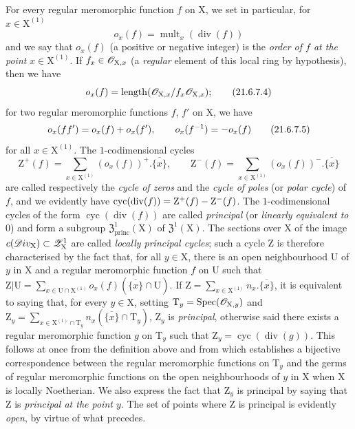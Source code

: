 \begin{env}[21.6.7]
For every regular meromorphic function $f$ on $\mathrm{X}$, we set in particular, for $x\in\mathrm{X}^{(1)}$
\[
\label{IV.21.6.7.3}
  o_x(f)=\operatorname{mult}_x(\operatorname{div}(f))
  \tag{21.6.7.3}
\]
and we say that $o_x(f)$ (a positive or negative integer) is the \emph{order of $f$ at the point} $x\in\mathrm{X}^{(1)}$.
If $f_x\in\mathscr{O}_{\mathrm{X},x}$ (a \emph{regular} element of this local ring by hypothesis), then we have
\[
\label{IV.21.6.7.4}
  o_x(f)=\operatorname{length}(\mathscr{O}_{\mathrm{X},x}/f_x\mathscr{O}_{\mathrm{X},x});
  \tag{21.6.7.4}
\]
for two regular meromorphic functions $f$, $f'$ on $\mathrm{X}$, we have
\[
\label{IV.21.6.7.5}
  o_x(ff')=o_x(f)+o_x(f'),\qquad o_x(f^{-1})=- o_x(f)
  \tag{21.6.7.5}
\]
for all $x\in\mathrm{X}^{(1)}$.
The $1$-codimensional cycles
\[
  \mathrm{Z}^+(f)=\sum_{x\in\mathrm{X}^{(1)}}(o_x(f))^+.\overline{\{x\}},\qquad
  \mathrm{Z}^-(f)=\sum_{x\in\mathrm{X}^{(1)}}(o_x(f))^-.\overline{\{x\}}
\]
are called respectively the \emph{cycle of zeros} and the \emph{cycle of poles} (or \emph{polar cycle}) of $f$, and we evidently have $\operatorname{cyc}(\operatorname{div}(f))=\mathrm{Z}^+(f)- \mathrm{Z}^-(f)$.
The $1$-codimensional cycles of the form $\operatorname{cyc}(\operatorname{div}(f))$ are called \emph{principal} (or \emph{linearly equivalent to} $0$) and form a subgroup $\mathfrak{Z}^1_\mathrm{princ}(\mathrm{X})$ of $\mathfrak{Z}^1(\mathrm{X})$.
The sections over $\mathrm{X}$ of the image $c(\mathscr{D}iv_\mathrm{X})\subset\mathscr{Z}_\mathrm{X}^1$ are
called \emph{locally principal cycles};
such a cycle $\mathrm{Z}$ is therefore characterised by the fact that, for all $y\in\mathrm{X}$, there is an open neighbourhood $\mathrm{U}$ of $y$ in $\mathrm{X}$ and a regular meromorphic function $f$ on $\mathrm{U}$ such that $\mathrm{Z}|\mathrm{U}=\sum_{x\in\mathrm{U}\cap\mathrm{X}^{(1)}}o_x(f)(\overline{\{x\}}\cap\mathrm{U})$.
If $\mathrm{Z}=\sum_{x\in\mathrm{X}^{(1)}}n_x.\overline{\{x\}}$, it is equivalent to saying that, for every $y\in\mathrm{X}$, setting $\mathrm{T}_y=\operatorname{Spec}(\mathscr{O}_{\mathrm{X},y})$ and $\mathrm{Z}_y=\sum_{x\in\mathrm{X}^{(1)}\cap\mathrm{T}_y}n_x(\overline{\{x\}}\cap\mathrm{T}_y)$, $\mathrm{Z}_y$ is \emph{principal}, otherwise said there exists a regular meromorphic function $g$ on $\mathrm{T}_y$ such that $\mathrm{Z}_y=\operatorname{cyc}(\operatorname{div}(g))$.
This follows at once from the definition above and from  which establishes a bijective correspondence between the regular meromorphic functions on $\mathrm{T}_y$ and the germs of regular meromorphic functions on the open neighbourhoods of $y$ in $\mathrm{X}$ when $\mathrm{X}$ is locally Noetherian.
We also express the fact that $\mathrm{Z}_y$ is principal by saying that $\mathrm{Z}$ is \emph{principal at the point $y$}.
The set of points where $\mathrm{Z}$ is principal is evidently \emph{open}, by virtue of what precedes.


\end{env}
